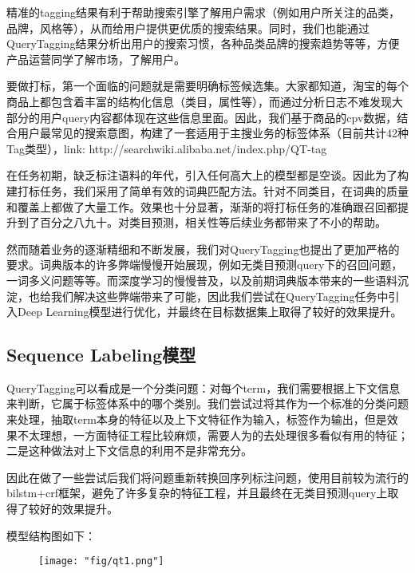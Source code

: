 精准的tagging结果有利于帮助搜索引擎了解用户需求（例如用户所关注的品类，品牌，风格等），从而给用户提供更优质的搜索结果。同时，我们也能通过QueryTagging结果分析出用户的搜索习惯，各种品类品牌的搜索趋势等等，方便产品运营同学了解市场，了解用户。
\par 要做打标，第一个面临的问题就是需要明确标签候选集。大家都知道，淘宝的每个商品上都包含着丰富的结构化信息（类目，属性等），而通过分析日志不难发现大部分的用户query内容都体现在这些信息里面。因此，我们基于商品的cpv数据，结合用户最常见的搜索意图，构建了一套适用于主搜业务的标签体系（目前共计42种Tag类型），link: http://searchwiki.alibaba.net/index.php/QT-tag%
\par 在任务初期，缺乏标注语料的年代，引入任何高大上的模型都是空谈。因此为了构建打标任务，我们采用了简单有效的词典匹配方法。针对不同类目，在词典的质量和覆盖上都做了大量工作。效果也十分显著，渐渐的将打标任务的准确跟召回都提升到了百分之八九十。对类目预测，相关性等后续业务都带来了不小的帮助。
\par 然而随着业务的逐渐精细和不断发展，我们对QueryTagging也提出了更加严格的要求。词典版本的许多弊端慢慢开始展现，例如无类目预测query下的召回问题，一词多义问题等等。而深度学习的慢慢普及，以及前期词典版本带来的一些语料沉淀，也给我们解决这些弊端带来了可能，因此我们尝试在QueryTagging任务中引入Deep Learning模型进行优化，并最终在目标数据集上取得了较好的效果提升。

\subsection{Sequence Labeling模型}
QueryTagging可以看成是一个分类问题：对每个term，我们需要根据上下文信息来判断，它属于标签体系中的哪个类别。我们尝试过将其作为一个标准的分类问题来处理，抽取term本身的特征以及上下文特征作为输入，标签作为输出，但是效果不太理想，一方面特征工程比较麻烦，需要人为的去处理很多看似有用的特征；二是这种做法对上下文信息的利用不是非常充分。
\par 因此在做了一些尝试后我们将问题重新转换回序列标注问题，使用目前较为流行的bilstm+crf框架，避免了许多复杂的特征工程，并且最终在无类目预测query上取得了较好的效果提升。
\par 模型结构图如下：
\begin{figure}[!h]
	\centering
	\texttt{[image: "fig/qt1.png"]}
	\caption{}
	\label{fig:qt1}
\end{figure}

